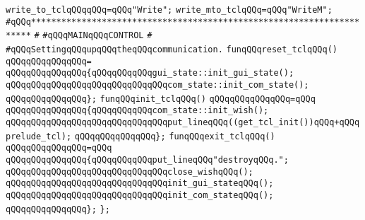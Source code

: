 \verb|write_to_tclqQQqqQQq=qQQq"Write";|\newline
\verb|write_mto_tclqQQq=qQQq"WriteM";|\newline
\newline
\newline
\newline
\verb|#qQQq**********************************************************************|\newline
\verb|#|\newline
\verb|#qQQqMAINqQQqCONTROL|\newline
\verb|#|\newline
\verb|#qQQqSettingqQQqupqQQqtheqQQqcommunication.|\newline
\newline
\newline
\newline
\verb|funqQQqreset_tclqQQq()|\newline
\verb|qQQqqQQqqQQqqQQq=|\newline
\verb|qQQqqQQqqQQqqQQq{qQQqqQQqqQQqgui_state::init_gui_state();|\newline
\verb|qQQqqQQqqQQqqQQqqQQqqQQqqQQqqQQqcom_state::init_com_state();|\newline
\verb|qQQqqQQqqQQqqQQq};|\newline
\newline
\verb|funqQQqinit_tclqQQq()|\newline
\verb|qQQqqQQqqQQqqQQq=qQQq|\newline
\verb|qQQqqQQqqQQqqQQq{qQQqqQQqqQQqcom_state::init_wish();|\newline
\newline
\verb|qQQqqQQqqQQqqQQqqQQqqQQqqQQqqQQqput_lineqQQq((get_tcl_init())qQQq+qQQqprelude_tcl);|\newline
\verb|qQQqqQQqqQQqqQQq};|\newline
\newline
\verb|funqQQqexit_tclqQQq()|\newline
\verb|qQQqqQQqqQQqqQQq=qQQq|\newline
\verb|qQQqqQQqqQQqqQQq{qQQqqQQqqQQqput_lineqQQq"destroyqQQq.";|\newline
\verb|qQQqqQQqqQQqqQQqqQQqqQQqqQQqqQQqclose_wishqQQq();|\newline
\verb|qQQqqQQqqQQqqQQqqQQqqQQqqQQqqQQqinit_gui_stateqQQq();|\newline
\verb|qQQqqQQqqQQqqQQqqQQqqQQqqQQqqQQqinit_com_stateqQQq();|\newline
\verb|qQQqqQQqqQQqqQQq};|\newline
\newline
\verb|};|\newline
\newline

